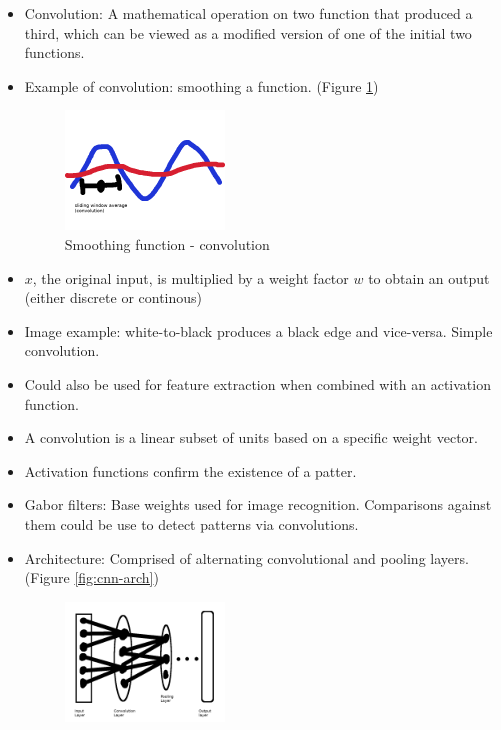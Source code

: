 \documentclass[parskip=half]{scrartcl}
\begin{document}
    \begin{itemize}
        \item 
        Convolution: A mathematical operation on two function that produced a third, which can be viewed as a modified version of one of the initial two functions.
        \item 
        Example of convolution: smoothing a function. (Figure \ref{fig:cnn-smoothing})
        \begin{figure}[ht]
            \centering
            \includegraphics[width=0.4\textwidth]{cnn-smoothing}
            \caption{Smoothing function - convolution}
            \label{fig:cnn-smoothing}
        \end{figure}
        \item 
        $x$, the original input, is multiplied by a weight factor $w$ to obtain an output (either discrete or continous)
        \item 
        Image example: white-to-black produces a black edge and vice-versa. Simple convolution.
        \item 
        Could also be used for feature extraction when combined with an activation function.
        \item 
        A convolution is a linear subset of units based on a specific weight vector.
        \item 
        Activation functions confirm the existence of a patter.
        \item 
        Gabor filters: Base weights used for image recognition. Comparisons against them could be use to detect patterns via convolutions.
        \item 
        Architecture: Comprised of alternating convolutional and pooling layers. (Figure \ref{fig:cnn-arch})
        \begin{figure}[ht]
            \centering
            \includegraphics[width=0.4\textwidth]{cnn-arch}

\end{figure}
\end{itemize}
\end{document}
